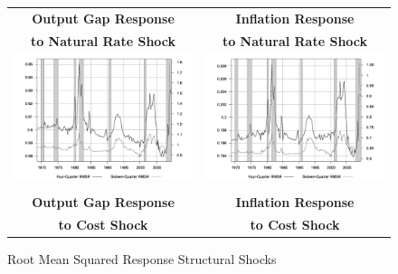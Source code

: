 \documentclass[10pt]{article}
\begin{document}
{\begin{figure}\caption{Root Mean Squared Response Structural Shocks}\label{fg:irf_structural_size}
\hspace*{-2pc}
\begin{tabular}{cc}\\
\textbf{Output Gap Response} & \textbf{Inflation Response} \\
\textbf{to Natural Rate Shock} & \textbf{to Natural Rate Shock}  \\
\includegraphics[scale=0.17]{images/RMS16_Output_Gap_Natural_Rate_Shock.png} & \includegraphics[scale=0.17]{images/RMS16_Inflation_Natural_Rate_Shock.png} \\\\
\textbf{Output Gap Response} & \textbf{Inflation Response} \\
\textbf{to Cost Shock} & \textbf{to Cost Shock}  \\

\end{tabular}
\end{figure}}
\end{document}
